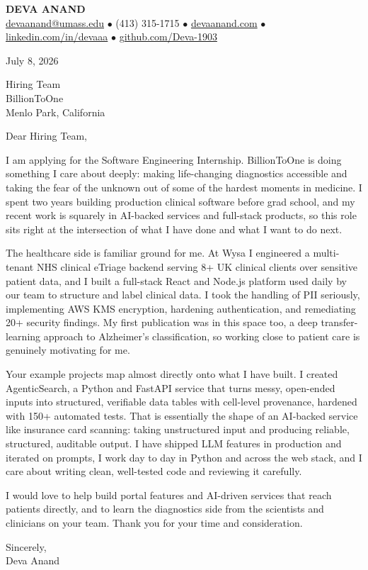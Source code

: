 \documentclass[letterpaper,11pt]{article}
\begin{document}
\begin{center}
    {\fontsize{18}{20}\selectfont\bfseries DEVA ANAND}\\ \vspace{3pt}
    {\small
    \href{mailto:devaanand@umass.edu}{devaanand@umass.edu}
    \enspace$\bullet$\enspace
    (413) 315-1715
    \enspace$\bullet$\enspace
    \href{https://devaanand.com}{devaanand.com}
    \enspace$\bullet$\enspace
    \href{https://linkedin.com/in/devaaa/}{linkedin.com/in/devaaa}
    \enspace$\bullet$\enspace
    \href{https://github.com/Deva-1903}{github.com/Deva-1903}}
\end{center}

\vspace{6pt}

July 8, 2026

Hiring Team \\
BillionToOne \\
Menlo Park, California

\vspace{2pt}

Dear Hiring Team,

I am applying for the Software Engineering Internship. BillionToOne is doing something I care about deeply: making life-changing diagnostics accessible and taking the fear of the unknown out of some of the hardest moments in medicine. I spent two years building production clinical software before grad school, and my recent work is squarely in AI-backed services and full-stack products, so this role sits right at the intersection of what I have done and what I want to do next.

The healthcare side is familiar ground for me. At Wysa I engineered a multi-tenant NHS clinical eTriage backend serving 8+ UK clinical clients over sensitive patient data, and I built a full-stack React and Node.js platform used daily by our team to structure and label clinical data. I took the handling of PII seriously, implementing AWS KMS encryption, hardening authentication, and remediating 20+ security findings. My first publication was in this space too, a deep transfer-learning approach to Alzheimer's classification, so working close to patient care is genuinely motivating for me.

Your example projects map almost directly onto what I have built. I created AgenticSearch, a Python and FastAPI service that turns messy, open-ended inputs into structured, verifiable data tables with cell-level provenance, hardened with 150+ automated tests. That is essentially the shape of an AI-backed service like insurance card scanning: taking unstructured input and producing reliable, structured, auditable output. I have shipped LLM features in production and iterated on prompts, I work day to day in Python and across the web stack, and I care about writing clean, well-tested code and reviewing it carefully.

I would love to help build portal features and AI-driven services that reach patients directly, and to learn the diagnostics side from the scientists and clinicians on your team. Thank you for your time and consideration.

\vspace{6pt}

Sincerely, \\
Deva Anand
\end{document}
